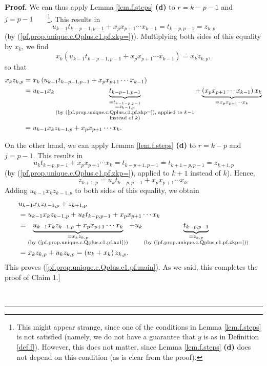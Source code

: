 \documentclass[numbers=enddot,12pt,final,onecolumn,notitlepage]{scrartcl}%
\theoremstyle{definition}
\newenvironment{proof}[1][Proof]{\noindent\textbf{#1.} }{\ \rule{0.5em}{0.5em}}
\newenvironment{verlong}{}{}
\begin{document}
\begin{verlong}
\begin{proof}
We can thus apply Lemma \ref{lem.f.steps} \textbf{(d)} to $r=k-p-1$ and
$j=p-1$\ \ \ \ \footnote{This might appear strange, since one of the
conditions in Lemma \ref{lem.f.steps} is not satisfied (namely, we do not have
a guarantee that $y$ is as in Definition \ref{def.f}). However, this does not
matter, since Lemma \ref{lem.f.steps} \textbf{(d)} does not depend on this
condition (as is clear from the proof).}. This results in%
\[
u_{k-1}t_{k-p-1,p-1}+x_{p}x_{p+1}\cdots x_{k-1}=t_{k-p,p-1}=z_{k,p}%
\]
(by (\ref{pf.prop.unique.c.Qplus.c1.pf.zkp=})). Multiplying both sides of this
equality by $x_{k}$, we find%
\[
x_{k}\left(  u_{k-1}t_{k-p-1,p-1}+x_{p}x_{p+1}\cdots x_{k-1}\right)
=x_{k}z_{k,p},
\]
so that%
\begin{align}
x_{k}z_{k,p}  &  =x_{k}\left(  u_{k-1}t_{k-p-1,p-1}+x_{p}x_{p+1}\cdots
x_{k-1}\right) \nonumber\\
&  =u_{k-1}x_{k}\underbrace{t_{k-p-1,p-1}}_{\substack{=t_{k-1-p,p-1}%
\\=z_{k-1,p}\\\text{(by (\ref{pf.prop.unique.c.Qplus.c1.pf.zkp=}), applied to
}k-1\\\text{instead of }k\text{)}}}+\underbrace{\left(  x_{p}x_{p+1}\cdots
x_{k-1}\right)  x_{k}}_{=x_{p}x_{p+1}\cdots x_{k}}\nonumber\\
&  =u_{k-1}x_{k}z_{k-1,p}+x_{p}x_{p+1}\cdots x_{k}.
\label{pf.prop.unique.c.Qplus.c1.pf.xz1}%
\end{align}


On the other hand, we can apply Lemma \ref{lem.f.steps} \textbf{(d)} to
$r=k-p$ and $j=p-1$. This results in%
\[
u_{k}t_{k-p,p-1}+x_{p}x_{p+1}\cdots x_{k}=t_{k-p+1,p-1}=t_{k+1-p,p-1}%
=z_{k+1,p}%
\]
(by (\ref{pf.prop.unique.c.Qplus.c1.pf.zkp=}), applied to $k+1$ instead of
$k$). Hence,%
\[
z_{k+1,p}=u_{k}t_{k-p,p-1}+x_{p}x_{p+1}\cdots x_{k}.
\]
Adding $u_{k-1}x_{k}z_{k-1,p}$ to both sides of this equality, we obtain%
\begin{align*}
&  u_{k-1}x_{k}z_{k-1,p}+z_{k+1,p}\\
&  =u_{k-1}x_{k}z_{k-1,p}+u_{k}t_{k-p,p-1}+x_{p}x_{p+1}\cdots x_{k}\\
&  =\underbrace{u_{k-1}x_{k}z_{k-1,p}+x_{p}x_{p+1}\cdots x_{k}}%
_{\substack{=x_{k}z_{k,p}\\\text{(by (\ref{pf.prop.unique.c.Qplus.c1.pf.xz1}%
))}}}+u_{k}\underbrace{t_{k-p,p-1}}_{\substack{=z_{k,p}\\\text{(by
(\ref{pf.prop.unique.c.Qplus.c1.pf.zkp=}))}}}\\
&  =x_{k}z_{k,p}+u_{k}z_{k,p}=\left(  u_{k}+x_{k}\right)  z_{k,p}.
\end{align*}
This proves (\ref{pf.prop.unique.c.Qplus.c1.pf.main}). As we said, this
completes the proof of Claim 1.]


\end{proof}
\end{verlong}
\end{document}
